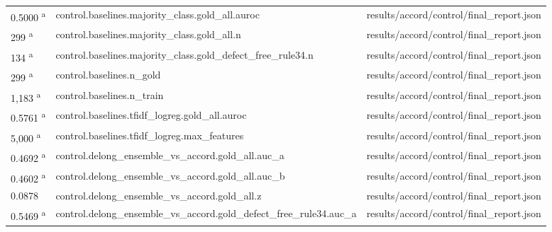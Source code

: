 \begin{longtable}{@{}p{0.7in}p{1.9in}p{2.6in}@{}}
0.5000 \textsuperscript{a} & control.\allowbreak{}baselines.\allowbreak{}majority\_class.\allowbreak{}gold\_all.\allowbreak{}auroc & results/\allowbreak{}accord/\allowbreak{}control/\allowbreak{}final\_report.\allowbreak{}json\\
299 \textsuperscript{a} & control.\allowbreak{}baselines.\allowbreak{}majority\_class.\allowbreak{}gold\_all.\allowbreak{}n & results/\allowbreak{}accord/\allowbreak{}control/\allowbreak{}final\_report.\allowbreak{}json\\
134 \textsuperscript{a} & control.\allowbreak{}baselines.\allowbreak{}majority\_class.\allowbreak{}gold\_defect\_free\_rule34.\allowbreak{}n & results/\allowbreak{}accord/\allowbreak{}control/\allowbreak{}final\_report.\allowbreak{}json\\
299 \textsuperscript{a} & control.\allowbreak{}baselines.\allowbreak{}n\_gold & results/\allowbreak{}accord/\allowbreak{}control/\allowbreak{}final\_report.\allowbreak{}json\\
1,183 \textsuperscript{a} & control.\allowbreak{}baselines.\allowbreak{}n\_train & results/\allowbreak{}accord/\allowbreak{}control/\allowbreak{}final\_report.\allowbreak{}json\\
0.5761 \textsuperscript{a} & control.\allowbreak{}baselines.\allowbreak{}tfidf\_logreg.\allowbreak{}gold\_all.\allowbreak{}auroc & results/\allowbreak{}accord/\allowbreak{}control/\allowbreak{}final\_report.\allowbreak{}json\\
5,000 \textsuperscript{a} & control.\allowbreak{}baselines.\allowbreak{}tfidf\_logreg.\allowbreak{}max\_features & results/\allowbreak{}accord/\allowbreak{}control/\allowbreak{}final\_report.\allowbreak{}json\\
0.4692 \textsuperscript{a} & control.\allowbreak{}delong\_ensemble\_vs\_accord.\allowbreak{}gold\_all.\allowbreak{}auc\_a & results/\allowbreak{}accord/\allowbreak{}control/\allowbreak{}final\_report.\allowbreak{}json\\
0.4602 \textsuperscript{a} & control.\allowbreak{}delong\_ensemble\_vs\_accord.\allowbreak{}gold\_all.\allowbreak{}auc\_b & results/\allowbreak{}accord/\allowbreak{}control/\allowbreak{}final\_report.\allowbreak{}json\\
0.0878 & control.\allowbreak{}delong\_ensemble\_vs\_accord.\allowbreak{}gold\_all.\allowbreak{}z & results/\allowbreak{}accord/\allowbreak{}control/\allowbreak{}final\_report.\allowbreak{}json\\
0.5469 \textsuperscript{a} & control.\allowbreak{}delong\_ensemble\_vs\_accord.\allowbreak{}gold\_defect\_free\_rule34.\allowbreak{}auc\_a & results/\allowbreak{}accord/\allowbreak{}control/\allowbreak{}final\_report.\allowbreak{}json\\

\end{longtable}
